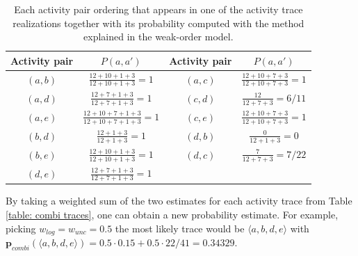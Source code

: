 % 
%
%
%
%
%
%
%
\begin{table}[h]

	\centering
	\begin{tabular}{cccc}
		\textbf{Activity pair} & \textbf{$P(a,a')$} & \textbf{Activity pair} & \textbf{$P(a,a')$}
		\\ \hline
	\multicolumn{1}{|c|}{$(a,b)$} & 
	\multicolumn{1}{|c|}{$\frac{12+10+1+3}{12+10+1+3} = 1$} & 
	\multicolumn{1}{|c|}{$(a,c)$} &
	\multicolumn{1}{|c|}{$\frac{12+10+7+3}{12+10+7+3} = 1$}
\\ \hline
	\multicolumn{1}{|c|}{$(a,d)$} & 
	\multicolumn{1}{|c|}{$\frac{12+7+1+3}{12+7+1+3} = 1$} & 
	\multicolumn{1}{|c|}{$(c,d)$} &
	\multicolumn{1}{|c|}{$\frac{12}{12+7+3} = 6/11$}
\\ \hline
	\multicolumn{1}{|c|}{$(a,e)$} & 
	\multicolumn{1}{|c|}{$\frac{12+10+7+1+3}{12+10+7+1+3} = 1$} & 
	\multicolumn{1}{|c|}{$(c,e)$} &
	\multicolumn{1}{|c|}{$\frac{12+10+7+3}{12+10+7+3} = 1$}
\\ \hline
	\multicolumn{1}{|c|}{$(b,d)$} & 
	\multicolumn{1}{|c|}{$\frac{12+1+3}{12+1+3} = 1$} & 
	\multicolumn{1}{|c|}{$(d,b)$} &
	\multicolumn{1}{|c|}{$\frac{0}{12+1+3} = 0$}
\\ \hline
	\multicolumn{1}{|c|}{$(b,e)$} & 
	\multicolumn{1}{|c|}{$\frac{12+10+1+3}{12+10+1+3} = 1$} & 
	\multicolumn{1}{|c|}{$(d,c)$} &
	\multicolumn{1}{|c|}{$\frac{7}{12+7+3} = 7/22$}
\\ \hline
	\multicolumn{1}{|c|}{$(d,e)$} & 
	\multicolumn{1}{|c|}{$\frac{12+7+1+3}{12+7+1+3} = 1$} & 
	\multicolumn{1}{|c|}{} &
	\multicolumn{1}{|c|}{}
\\ \hline


	\end{tabular}
	\caption{Each activity pair ordering that appears in one of the activity trace realizations together with its probability computed with the method explained in the weak-order model.}
	\label{table: combi pairs}
\end{table} 
% 
%
%
By taking a weighted sum of the two estimates for each activity trace from Table \ref{table: combi traces}, one can obtain a new probability estimate.
For example, picking $w_{log} = w_{unc} = 0.5$ the most likely trace would be $\langle a,b,d,e \rangle$ with $\textbf{p}_{combi}(\langle a,b,d,e \rangle) = 0.5 \cdot 0.15 + 0.5 \cdot 22/41 = 0.34329$.
